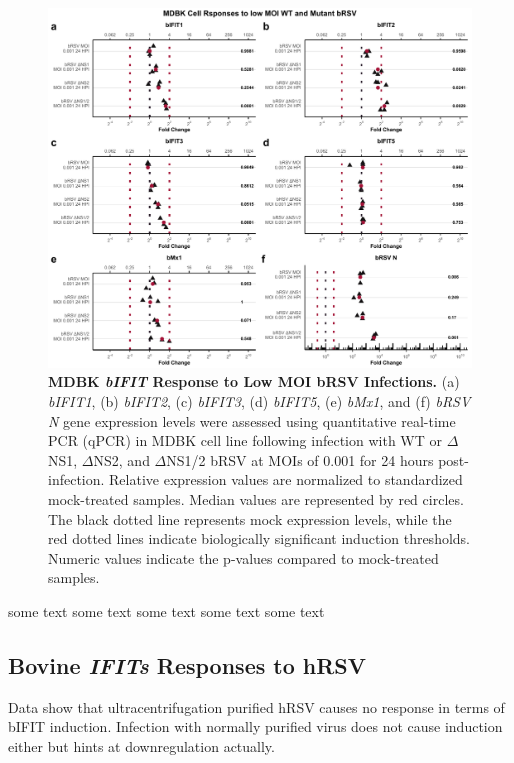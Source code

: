 \begin{figure}
    \centering
    \includegraphics[width=1\linewidth]{07. Chapter 2/Figs/02. Induction/06. mdbk_brsv_low_moi.pdf}
    \caption[MDBK \textit{bIFIT} Response to Low MOI bRSV Infections.]{\textbf{MDBK \textit{bIFIT} Response to Low MOI bRSV Infections.} (a) \textit{bIFIT1}, (b) \textit{bIFIT2}, (c) \textit{bIFIT3}, (d) \textit{bIFIT5}, (e) \textit{bMx1}, and (f) \textit{bRSV N} gene expression levels were assessed using quantitative real-time PCR (qPCR) in MDBK cell line following infection with WT or \(\Delta\)NS1, \(\Delta\)NS2, and \(\Delta\)NS1/2 bRSV at MOIs of 0.001 for 24 hours post-infection. Relative expression values are normalized to standardized mock-treated samples. Median values are represented by red circles. The black dotted line represents mock expression levels, while the red dotted lines indicate biologically significant induction thresholds. Numeric values indicate the p-values compared to mock-treated samples.}
    \label{fig:MDBK responses to low MOI mutant bRSV}
\end{figure}

some text some text some text some text some text

\subsection{Bovine \textit{IFITs} Responses to hRSV} \label{subsec:Bovine IFITs Responses to hRSV}

Data show that ultracentrifugation purified hRSV causes no response in terms of bIFIT induction. Infection with normally purified virus does not cause induction either but hints at downregulation actually.

